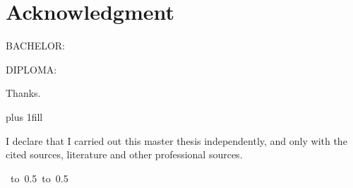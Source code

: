 \chapter*{Acknowledgment}

\todo{}

BACHELOR:



DIPLOMA:

Thanks.

\vglue 0pt plus 1fill

\noindent
I declare that I carried out this master thesis independently, and only with the cited
sources, literature and other professional sources.


\vspace{10mm}

\hbox{
	\hbox to 0.5
	\hbox to 0.5
	}

\newpage